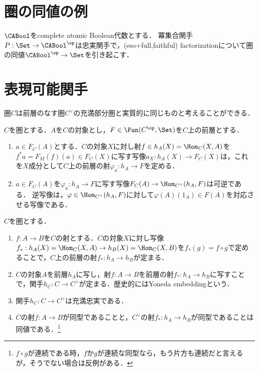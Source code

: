 \documentclass[uplatex,dvipdfmx]{jsreport}
\begin{document}
\section{圏の同値の例}

\begin{proposition}
    $\CABool$をcomplete atomic Boolean代数とする．
    冪集合関手$P:\Set\to\CABool^\op$は忠実関手で，(eso+full,faithful) factorizationについて圏の同値$\CABool^\op\to\Set$を引き起こす．
\end{proposition}

\section{表現可能関手}

\begin{tcolorbox}[colframe=ForestGreen, colback=ForestGreen!10!white,breakable,colbacktitle=ForestGreen!40!white,coltitle=black,fonttitle=\bfseries\sffamily,
title=]
    圏$C$は前層のなす圏$C^\vee$の充満部分圏と実質的に同じものと考えることができる．
\end{tcolorbox}

\begin{proposition}[米田の補題]
    $C$を圏とする．$A$を$C$の対象とし，$F\in\Fun(C^\op,\Set)$を$C$上の前層とする．
    \begin{enumerate}
        \item $a\in F_C(A)$とする．$C$の対象$X$に対し射$f\in h_A(X)=\Hom_C(X,A)$を$f^*a=F_M(f)(a)\in F_C(X)$に写す写像$a_X:h_A(X)\to F_C(X)$は，これを$X$成分として$C$上の前層の射$\varphi_a:h_A\to F$を定める．
        \item $a\in F_C(A)$を$\varphi_a:h_A\to F$に写す写像$F_C(A)\to\Hom_{C^\vee}(h_A,F)$は可逆である．
        逆写像は，$\varphi\in\Hom_{C^\vee}(h_A,F)$に対して$\varphi(A)(1_A)\in F(A)$を対応させる写像である．
    \end{enumerate}
\end{proposition}

\begin{corollary}
    $C$を圏とする．
    \begin{enumerate}
        \item $f:A\to B$を$C$の射とする．$C$の対象$X$に対し写像$f_*:h_A(X)=\Hom_C(X,A)\to h_B(X)=\Hom_C(X,B)$を$f_*(g)=f\circ g$で定めることで，$C$上の前層の射$f_*:h_A\to h_B$が定まる．
        \item $C$の対象$A$を前層$h_A$に写し，射$f:A\to B$を前層の射$f_*:h_A\to h_B$に写すことで，関手$h_C:C\to C^\vee$が定まる．歴史的にはYoneda embeddingという．
        \item 関手$h_C:C\to C^\vee$は充満忠実である．
        \item $C$の射$f:A\to B$が同型であることと，$C^\vee$の射$f_*:h_A\to h_B$が同型であることは同値である．\footnote{$f\circ g$が連続である時，$f$か$g$が連続な同型なら，もう片方も連続だと言えるが，そうでない場合は反例がある．}
    \end{enumerate}
\end{corollary}
\end{document}
